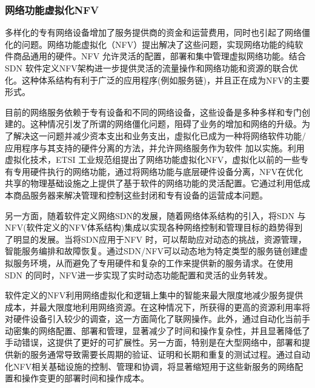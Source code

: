 




\subsubsection{网络功能虚拟化NFV}
多样化的专有网络设备增加了服务提供商的资金和运营费用，同时也引起了网络僵化的问题。网络功能虚拟化（NFV）提出解决了这些问题，实现网络功能的纯软件商品通用的硬件。NFV 允许灵活的配置，部署和集中管理虚拟网络功能。结合SDN 软件定义NFV架构进一步提供灵活的流量操作和网络功能和资源的联合优化。这种体系结构有利于广泛的应用程序(例如服务链)，并且正在成为NFV的主要形式。

目前的网络服务依赖于专有设备和不同的网络设备，这些设备是多种多样和专门创建的\cite{sherry2012making,wang2011untold,walfish2004middleboxes}。这种情况引发了所谓的网络僵化问题，阻碍了业务的增加和网络的升级。为了解决这一问题并减少资本支出和业务支出，虚拟化已成为一种将网络软件功能/应用程序与其支持的硬件分离的方法，并允许网络服务作为软件\cite{schaffrath2009network,chowdhury2010survey,chowdhury2009network} 加以实施。利用虚拟化技术，ETSI 工业规范组提出了网络功能虚拟化NFV，虚拟化以前的一些专有专用硬件执行的网络功能\cite{chiosi2012network,yue2013network}，通过将网络功能与底层硬件设备分离，NFV在优化共享的物理基础设施之上提供了基于软件的网络功能的灵活配置。它通过利用低成本商品服务器来解决管理和控制这些封闭和专有设备的运营成本问题。

另一方面，随着软件定义网络SDN的发展，随着网络体系结构\cite{manzalini2014software,yeganeh2013scalability,ge20145g}的引入，将SDN 与NFV(软件定义的NFV体系结构)集成以实现各种网络控制和管理目标的趋势得到了明显的发展。当将SDN应用于NFV 时，可以帮助应对动态的挑战，资源管理，智能服务编排和故障恢复。通过SDN/NFV可以动态地为特定类型的服务链创建虚拟服务环境，从而避免了专用硬件和复杂的工作来提供新的服务请求。在使用SDN 的同时，NFV进一步实现了实时动态功能配置和灵活的业务转发。

软件定义的NFV利用网络虚拟化和逻辑上集中的智能来最大限度地减少服务提供成本，并最大限度地利用网络资源。在这种情况下，所获得的更高的资源利用率将对硬件设备引入较少的调查，这一方面简化了联网操作。此外，通过自动化当前手动密集的网络配置、部署和管理，显著减少了时间和操作复杂性，并且显著降低了手动错误，这提供了更好的可扩展性。另一方面，特别是在大型网络中，部署和提供新的服务通常导致需要长周期的验证、证明和长期和重复的测试过程。通过自动化NFV相关基础设施的控制、管理和协调，将显著缩短用于这些新服务的网络配置和操作变更的部署时间和操作成本。

